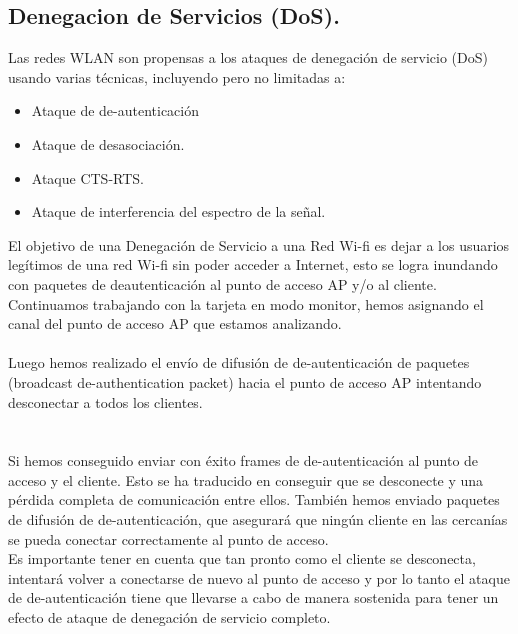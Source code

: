 \subsection {Denegacion de Servicios (DoS).} 

Las redes WLAN son propensas a los ataques de denegación de servicio (DoS) usando varias técnicas, incluyendo pero no limitadas a: \\

 \begin{itemize}
   	\item Ataque de de-autenticación 
	\item Ataque de desasociación.
	\item Ataque CTS-RTS.
	\item Ataque de interferencia del espectro de la señal. 
 \end{itemize}

El objetivo de una Denegación de Servicio a una Red Wi-fi es dejar a los usuarios legítimos de una red Wi-fi sin poder acceder a Internet, esto se logra inundando con paquetes de deautenticación al punto de acceso AP y/o al cliente.\\

Continuamos trabajando con la tarjeta en modo monitor, hemos asignando el canal del punto de acceso AP que estamos analizando.\\

\textbf{}\\

Luego hemos realizado el envío de difusión de de-autenticación de paquetes (broadcast de-authentication packet) hacia el punto de acceso AP intentando desconectar a todos los clientes.\\

\textbf{}\\

\textbf{}\\

Si hemos conseguido enviar con éxito frames de de-autenticación al punto de acceso y el cliente. Esto se ha traducido en conseguir que se desconecte y una pérdida completa de comunicación entre ellos.
También hemos enviado paquetes de difusión de de-autenticación, que asegurará que ningún cliente en las cercanías se pueda conectar correctamente al punto de acceso.\\

Es importante tener en cuenta que tan pronto como el cliente se desconecta, intentará volver a conectarse de nuevo al punto de acceso y por lo tanto el ataque de de-autenticación tiene que llevarse a cabo de manera sostenida para tener un efecto de ataque de denegación de servicio completo.\\
